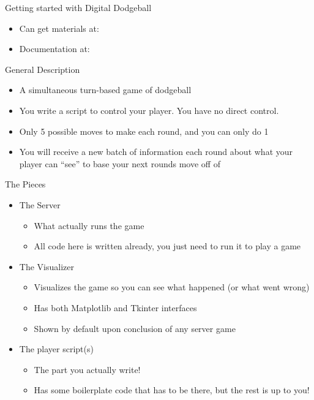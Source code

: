 \documentclass[pdf, aspectratio=169, 12pt]{beamer}
\begin{document}
\begin{frame}{Getting started with Digital Dodgeball}
	\begin{itemize}
		\item Can get materials at: 
			\vspace{5mm}

		\item Documentation at: 
	\end{itemize}
\end{frame}

\begin{frame}{General Description}
	\begin{itemize}
		\item A simultaneous turn-based game of dodgeball
		\item You write a \alert{script} to control your player. You have no direct control.
		\item Only 5 possible moves to make each round, and you can only do 1
		\item You will receive a new batch of information each round about what your player can ``see'' to base your next rounds move off of
	\end{itemize}
\end{frame}

\begin{frame}{The Pieces}
	\begin{itemize}
		\item The Server
			\begin{itemize}
				\item What actually runs the game
				\item All code here is written already, you just need to run it to play a game
			\end{itemize}
		\item The Visualizer
			\begin{itemize}
				\item Visualizes the game so you can see what happened (or what went wrong)
				\item Has both Matplotlib and Tkinter interfaces
				\item Shown by default upon conclusion of any server game
			\end{itemize}
		\item The player script(s)
			\begin{itemize}
				\item The part you actually write!
				\item Has some boilerplate code that has to be there, but the rest is up to you!
			\end{itemize}
	\end{itemize}
\end{frame}
\end{document}
